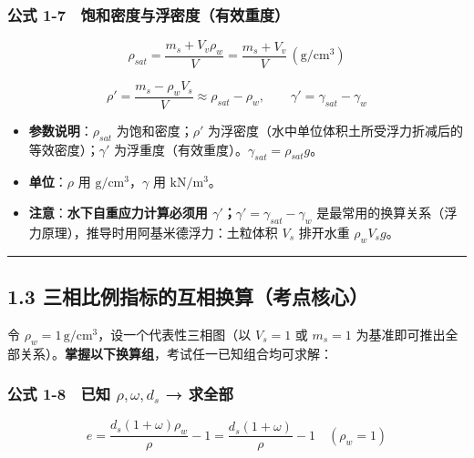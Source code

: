 \documentclass[
]{article}
\providecommand{\tightlist}{%
  \setlength{\itemsep}{0pt}\setlength{\parskip}{0pt}}
\begin{document}
\subsubsection{公式
1-7　饱和密度与浮密度（有效重度）}\label{ux516cux5f0f-1-7-ux9971ux548cux5bc6ux5ea6ux4e0eux6d6eux5bc6ux5ea6ux6709ux6548ux91cdux5ea6}

\[\rho_{sat}=\frac{m_s+V_v\rho_w}{V}=\frac{m_s+V_v}{V}\,\mathrm{(g/cm^3)}\]

\[\rho'=\frac{m_s-\rho_w V_s}{V}\approx\rho_{sat}-\rho_w,\qquad \gamma'=\gamma_{sat}-\gamma_w\]

\begin{itemize}
\tightlist
\item
  \textbf{参数说明}：\(\rho_{sat}\) 为饱和密度；\(\rho'\)
  为浮密度（水中单位体积土所受浮力折减后的等效密度）；\(\gamma'\)
  为浮重度（有效重度）。\(\gamma_{sat}=\rho_{sat}g\)。
\item
  \textbf{单位}：\(\rho\) 用 \(\mathrm{g/cm^3}\)，\(\gamma\) 用
  \(\mathrm{kN/m^3}\)。
\item
  \textbf{注意}：\textbf{水下自重应力计算必须用
  \(\gamma'\)；\(\gamma'=\gamma_{sat}-\gamma_w\)}
  是最常用的换算关系（浮力原理），推导时用阿基米德浮力：土粒体积 \(V_s\)
  排开水重 \(\rho_w V_s g\)。
\end{itemize}

\begin{center}\rule{0.5\linewidth}{0.5pt}\end{center}

\subsection{1.3
三相比例指标的互相换算（考点核心）}\label{ux4e09ux76f8ux6bd4ux4f8bux6307ux6807ux7684ux4e92ux76f8ux6362ux7b97ux8003ux70b9ux6838ux5fc3}

令 \(\rho_w=1\,\mathrm{g/cm^3}\)，设一个代表性三相图（以 \(V_s=1\) 或
\(m_s=1\)
为基准即可推出全部关系）。\textbf{掌握以下换算组}，考试任一已知组合均可求解：

\subsubsection{\texorpdfstring{公式 1-8　已知 \(\rho,\omega,d_s\) →
求全部}{公式 1-8　已知 \textbackslash rho,\textbackslash omega,d\_s → 求全部}}\label{ux516cux5f0f-1-8-ux5df2ux77e5-rhoomegad_s-ux6c42ux5168ux90e8}

\[e=\frac{d_s(1+\omega)\rho_w}{\rho}-1=\frac{d_s(1+\omega)}{\rho}-1\quad(\rho_w=1)\]
\end{document}

